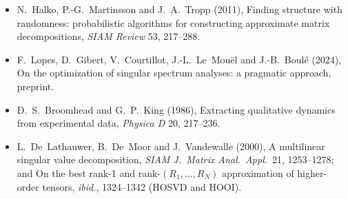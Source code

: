 \documentclass[10pt]{article}
\begin{document}
\begin{itemize}
        extensions of singular spectrum analysis with the Rssa package, \emph{J.\ Stat.\
        Software} 67(2), 1--78.
  \item N.~Halko, P.-G.~Martinsson and J.~A.~Tropp (2011), Finding structure with randomness:
        probabilistic algorithms for constructing approximate matrix decompositions, \emph{SIAM
        Review} 53, 217--288.
  \item F.~Lopes, D.~Gibert, V.~Courtillot, J.-L.~Le~Mou\"el and J.-B.~Boul\'e (2024), On the
        optimization of singular spectrum analyses: a pragmatic approach, preprint.
  \item D.~S.~Broomhead and G.~P.~King (1986), Extracting qualitative dynamics from
        experimental data, \emph{Physica D} 20, 217--236.
  \item L.~De~Lathauwer, B.~De~Moor and J.~Vandewalle (2000), A multilinear singular value
        decomposition, \emph{SIAM J.\ Matrix Anal.\ Appl.}\ 21, 1253--1278; and On the best
        rank-1 and rank-$(R_1,\dots,R_N)$ approximation of higher-order tensors, \emph{ibid.},
        1324--1342 (HOSVD and HOOI).
\end{itemize}

\end{document}
